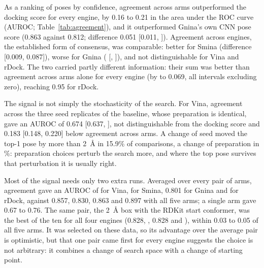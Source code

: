 As a ranking of poses by confidence, agreement across arms outperformed the docking score
for every engine, by 0.16 to 0.21 in the area under the ROC curve (AUROC;
Table~\ref{tab:agreement}), and it outperformed Gnina's own CNN pose score (0.863 against
0.812; difference 0.051 [0.011, ]). Agreement across engines, the established form of
consensus, was comparable: better for Smina (difference  [0.009, 0.087]), worse for
Gnina ( [, ]), and not distinguishable for Vina and rDock. The two
carried partly different information: their sum was better than agreement across arms alone
for every engine (by  to 0.069, all intervals excluding zero), reaching 0.95 for
rDock.

The signal is not simply the stochasticity of the search. For Vina, agreement across the
three seed replicates of the baseline, whose preparation is identical, gave an AUROC of
0.674 [0.637, ], not distinguishable from the docking score and 0.183 [0.148, 0.220]
below agreement across arms. A change of seed moved the top-1 pose by more than
\SI{2}{\angstrom} in 15.9\% of comparisons, a change of preparation in \%: preparation
choices perturb the search more, and where the top pose survives that perturbation it is
usually right.

Most of the signal needs only two extra runs. Averaged over every pair of arms, agreement
gave an AUROC of  for Vina,  for Smina, 0.801 for Gnina and  for rDock,
against 0.857, 0.830, 0.863 and 0.897 with all five arms; a single arm gave 0.67 to 0.76.
The same pair, the \SI{2}{\angstrom} box with the RDKit start conformer, was the best of the
ten for all four engines (0.828, , 0.828 and ), within 0.03 to 0.05 of all five
arms. It was selected on these data, so its advantage over the average pair is optimistic,
but that one pair came first for every engine suggests the choice is not arbitrary: it
combines a change of search space with a change of starting point.

